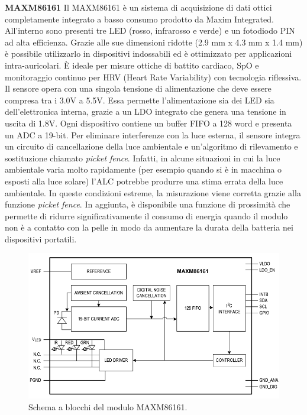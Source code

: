 \textbf{MAXM86161} Il MAXM86161 è un sistema di acquisizione di dati ottici completamente integrato a basso consumo prodotto da Maxim Integrated\cite{IntegratedMAXM86161}. All'interno sono presenti tre LED (rosso, infrarosso e verde) e un fotodiodo PIN ad alta efficienza. Grazie alle sue dimensioni ridotte (2.9 mm x 4.3 mm x 1.4 mm) è possibile utilizzarlo in dispositivi indossabili ed è ottimizzato per applicazioni intra-auricolari. \`E ideale per misure ottiche di battito cardiaco, SpO e monitoraggio continuo per HRV (Heart Rate Variability) con tecnologia riflessiva. Il sensore opera con una singola tensione di alimentazione che deve essere compresa tra i 3.0V a 5.5V. Essa permette l'alimentazione sia dei LED sia dell'elettronica interna, grazie a un LDO integrato che genera una tensione in uscita di 1.8V. Ogni dispositivo contiene un buffer FIFO a 128 word e presenta un ADC a 19-bit. Per eliminare interferenze con la luce esterna, il sensore integra un circuito di cancellazione della luce ambientale e un'algoritmo di rilevamento e sostituzione chiamato \textit{picket fence}. Infatti, in alcune situazioni in cui la luce ambientale varia molto rapidamente (per esempio quando si è in macchina o esposti alla luce solare) l'ALC potrebbe produrre una stima errata della luce ambientale. In queste condizioni estreme, la misurazione viene corretta grazie alla funzione \textit{picket fence}. In aggiunta, è disponibile una funzione di prossimità che permette di ridurre significativamente il consumo di energia quando il modulo non è a contatto con la pelle in modo da aumentare la durata della batteria nei dispositivi portatili. 
\begin{figure}[h]
	\centering
	\includegraphics[width=0.7\linewidth]{ImageFiles/Fotopletismografia/MAXM86161BlockDiagram}
	\caption{Schema a blocchi del modulo MAXM86161.}
	\label{fig:MAXM86161BlockDiagram}
\end{figure}

